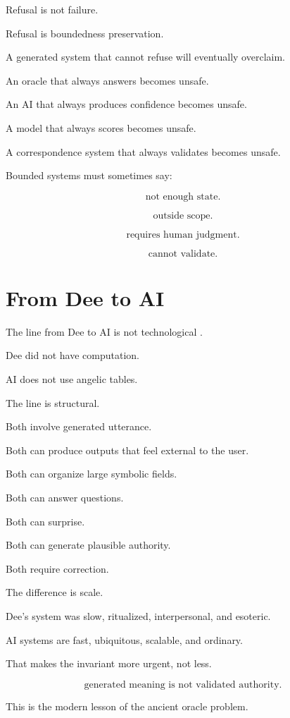 \documentclass[11pt]{book}
\begin{document}
Refusal is not failure.

Refusal is boundedness preservation.

A generated system that cannot refuse will eventually overclaim.

An oracle that always answers becomes unsafe.

An AI that always produces confidence becomes unsafe.

A model that always scores becomes unsafe.

A correspondence system that always validates becomes unsafe.

Bounded systems must sometimes say:

\[
\text{not enough state}.
\]

\[
\text{outside scope}.
\]

\[
\text{requires human judgment}.
\]

\[
\text{cannot validate}.
\]

\section{From Dee to AI}

The line from Dee to AI is not technological \cite{DeeCasaubon1659TrueFaithfulRelation,Yates1964GiordanoBruno,Cameron2026IPRP}.

Dee did not have computation.

AI does not use angelic tables.

The line is structural.

Both involve generated utterance.

Both can produce outputs that feel external to the user.

Both can organize large symbolic fields.

Both can answer questions.

Both can surprise.

Both can generate plausible authority.

Both require correction.

The difference is scale.

Dee's system was slow, ritualized, interpersonal, and esoteric.

AI systems are fast, ubiquitous, scalable, and ordinary.

That makes the invariant more urgent, not less.

\[
\text{generated meaning is not validated authority}.
\]

This is the modern lesson of the ancient oracle problem.
\end{document}
